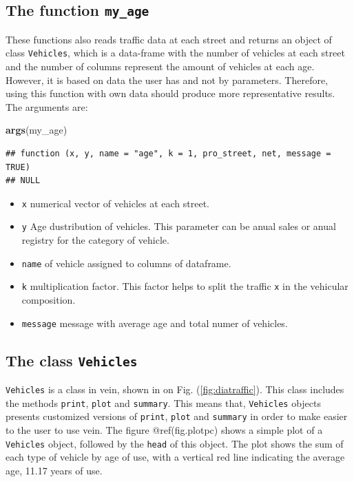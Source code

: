 \documentclass[12pt,graybox,envcountchap,sectrefs]{krantz}
\makeatletter
\newenvironment{Shaded}{\begin{snugshade}}{\end{snugshade}}
\newcommand{\KeywordTok}[1]{\textcolor[rgb]{0.13,0.29,0.53}{\textbf{#1}}}
\newcommand{\NormalTok}[1]{#1}
\providecommand{\tightlist}{%
  \setlength{\itemsep}{0pt}\setlength{\parskip}{0pt}}
\newenvironment{kframe}{%
\medskip{}
\setlength{\fboxsep}{.8em}
 \def\at@end@of@kframe{}%
 \ifinner\ifhmode%
  \def\at@end@of@kframe{\end{minipage}}%
  \begin{minipage}{\columnwidth}%
 \fi\fi%
 \def\FrameCommand##1{\hskip\@totalleftmargin \hskip-\fboxsep
 \colorbox{shadecolor}{##1}\hskip-\fboxsep
     \hskip-\linewidth \hskip-\@totalleftmargin \hskip\columnwidth}%
 \MakeFramed {\advance\hsize-\width
   \@totalleftmargin\z@ \linewidth\hsize
   \@setminipage}}%
 {\par\unskip\endMakeFramed%
 \at@end@of@kframe}
\renewenvironment{Shaded}{\begin{kframe}}{\end{kframe}}
\theoremstyle{definition}
\theoremstyle{definition}
\theoremstyle{definition}
\theoremstyle{remark}
\makeatother
\begin{document}
\subsection{\texorpdfstring{The function
\texttt{my\_age}}{The function my\_age}}\label{the-function-my_age}

These functions also reads traffic data at each street and returns an
object of class \texttt{Vehicles}, which is a data-frame with the number
of vehicles at each street and the number of columns represent the
amount of vehicles at each age. However, it is based on data the user
has and not by parameters. Therefore, using this function with own data
should produce more representative results. The arguments are:

\begin{Shaded}
\begin{Highlighting}[]
\KeywordTok{args}\NormalTok{(my_age)}
\end{Highlighting}
\end{Shaded}

\begin{verbatim}
## function (x, y, name = "age", k = 1, pro_street, net, message = TRUE) 
## NULL
\end{verbatim}

\begin{itemize}
\tightlist
\item
  \texttt{x} numerical vector of vehicles at each street.
\item
  \texttt{y} Age dustribution of vehicles. This parameter can be anual
  sales or anual registry for the category of vehicle.
\item
  \texttt{name} of vehicle assigned to columns of dataframe.
\item
  \texttt{k} multiplication factor. This factor helps to split the
  traffic \texttt{x} in the vehicular composition.
\item
  \texttt{message} message with average age and total numer of vehicles.
\end{itemize}

\subsection{\texorpdfstring{The class
\texttt{Vehicles}}{The class Vehicles}}\label{the-class-vehicles}

\texttt{Vehicles} is a class in vein, shown in on Fig.
(\ref{fig:diatraffic}). This class includes the methods \texttt{print},
\texttt{plot} and \texttt{summary}. This means that, \texttt{Vehicles}
objects presents customized versions of \texttt{print}, \texttt{plot}
and \texttt{summary} in order to make easier to the user to use vein.
The figure @ref(fig.plotpc) shows a simple plot of a \texttt{Vehicles}
object, followed by the \texttt{head} of this object. The plot shows the
sum of each type of vehicle by age of use, with a vertical red line
indicating the average age, 11.17 years of use.
\end{document}
